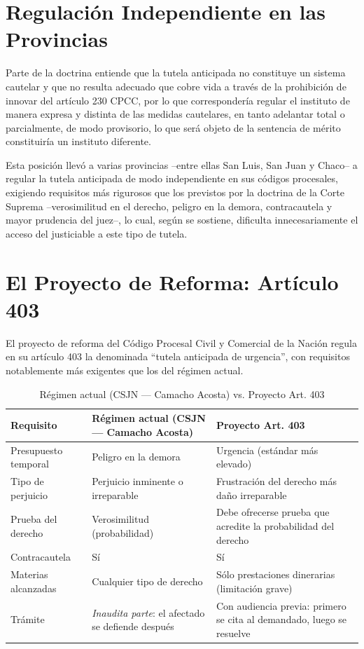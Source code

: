 \documentclass[12pt,oneside]{book}
\begin{document}
\section{Regulación Independiente en las Provincias}

Parte de la doctrina entiende que la tutela anticipada no constituye un sistema cautelar y que no resulta adecuado que cobre vida a través de la prohibición de innovar del artículo 230 CPCC, por lo que correspondería regular el instituto de manera expresa y distinta de las medidas cautelares, en tanto adelantar total o parcialmente, de modo provisorio, lo que será objeto de la sentencia de mérito constituiría un instituto diferente.

Esta posición llevó a varias provincias --entre ellas San Luis, San Juan y Chaco-- a regular la tutela anticipada de modo independiente en sus códigos procesales, exigiendo requisitos más rigurosos que los previstos por la doctrina de la Corte Suprema --verosimilitud en el derecho, peligro en la demora, contracautela y mayor prudencia del juez--, lo cual, según se sostiene, dificulta innecesariamente el acceso del justiciable a este tipo de tutela.

\section{El Proyecto de Reforma: Artículo 403}

El proyecto de reforma del Código Procesal Civil y Comercial de la Nación regula en su artículo 403 la denominada ``tutela anticipada de urgencia'', con requisitos notablemente más exigentes que los del régimen actual.

\begin{table}[H]
\centering
\caption{Régimen actual (CSJN --- Camacho Acosta) vs. Proyecto Art. 403}
\begin{tabularx}{\textwidth}{>{\raggedright\arraybackslash}p{} >{\raggedright\arraybackslash}p{} >{\raggedright\arraybackslash}X}
\toprule
\textbf{Requisito} & \textbf{Régimen actual (CSJN --- Camacho Acosta)} & \textbf{Proyecto Art. 403} \\
\midrule
Presupuesto temporal & Peligro en la demora & Urgencia (estándar más elevado) \\
Tipo de perjuicio & Perjuicio inminente o irreparable & Frustración del derecho más daño irreparable \\
Prueba del derecho & Verosimilitud (probabilidad) & Debe ofrecerse prueba que acredite la probabilidad del derecho \\
Contracautela & Sí & Sí \\
Materias alcanzadas & Cualquier tipo de derecho & Sólo prestaciones dinerarias (limitación grave) \\
Trámite & \emph{Inaudita parte}: el afectado se defiende después & Con audiencia previa: primero se cita al demandado, luego se resuelve \\
\bottomrule
\end{tabularx}
\end{table}
\end{document}
